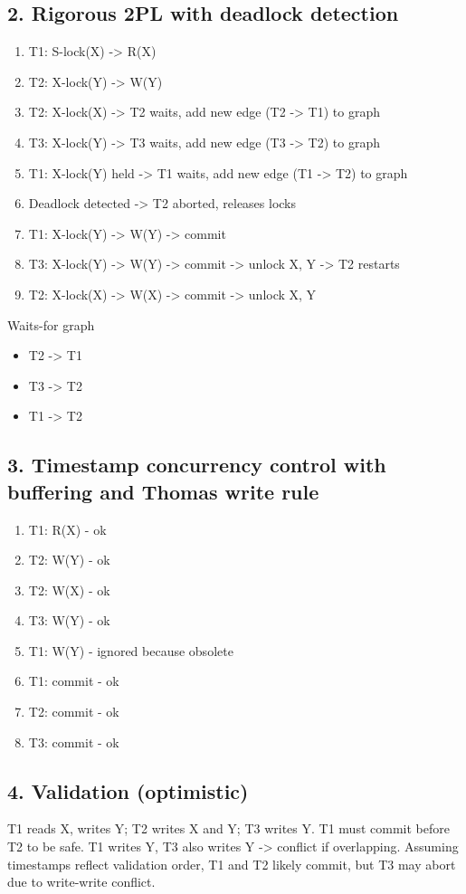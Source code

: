 \documentclass[fleqn]{article}
\begin{document}
  \subsection*{2. Rigorous 2PL with deadlock detection}
  \begin{enumerate}
    \item T1: S-lock(X) -> R(X)
    \item T2: X-lock(Y) -> W(Y)
    \item T2: X-lock(X) -> T2 waits, add new edge (T2 -> T1) to graph
    \item T3: X-lock(Y) -> T3 waits, add new edge (T3 -> T2) to graph
    \item T1: X-lock(Y) held -> T1 waits, add new edge (T1 -> T2) to graph
    \item Deadlock detected -> T2 aborted, releases locks
    \item T1: X-lock(Y) -> W(Y) -> commit
    \item T3: X-lock(Y) -> W(Y) -> commit -> unlock X, Y -> T2 restarts
    \item T2: X-lock(X) -> W(X) -> commit -> unlock X, Y
  \end{enumerate}
  Waits-for graph
  \begin{itemize}
    \item T2 -> T1
    \item T3 -> T2
    \item T1 -> T2
  \end{itemize}


  \subsection*{3. Timestamp concurrency control with buffering and Thomas write rule}
  \begin{enumerate}
    \item T1: R(X) - ok
    \item T2: W(Y) - ok
    \item T2: W(X) - ok
    \item T3: W(Y) - ok
    \item T1: W(Y) - ignored because obsolete
    \item T1: commit - ok
    \item T2: commit - ok
    \item T3: commit - ok
  \end{enumerate}

  
  \subsection*{4. Validation (optimistic)}
  T1 reads X, writes Y; T2 writes X and Y; T3 writes Y. T1 must commit before T2 to be safe. T1 writes Y, T3 also writes Y -> conflict if overlapping.
  Assuming timestamps reflect validation order, T1 and T2 likely commit, but T3 may abort due to write-write conflict.
\end{document}
